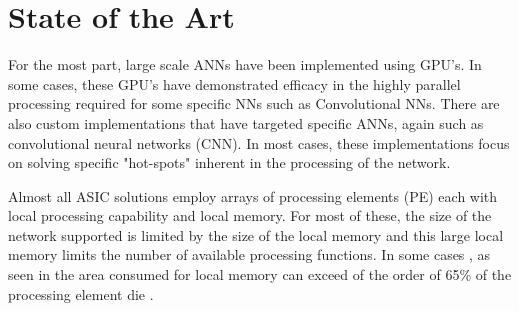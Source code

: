 
\chapter{State of the Art}
\label{chap-two}

For the most part, large scale ANNs have been implemented using GPU's.
In some cases, these GPU's have demonstrated efficacy in the highly parallel processing required for some specific NNs such as Convolutional NNs.
There are also custom implementations that have targeted specific ANNs\cite{chen201614}\cite{farabet2011neuflow}, 
again such as convolutional neural networks (CNN). In most cases, these implementations focus on
solving specific "hot-spots" inherent in the processing of the network\cite{chen201614}.

Almost all ASIC solutions employ arrays of processing elements (PE) each with local processing capability and local memory.
For most of these, the size of the network supported is limited by the size of the local memory and this large
local memory limits the number of available processing functions. %
In some cases \iftrue, as seen in \fi the area consumed for local memory can exceed of the order of 65\% of the 
processing element die \cite{kim2016neurocube}\cite{chen2014diannao}.

